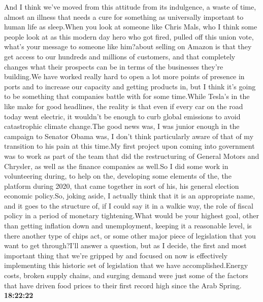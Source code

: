 \documentclass{article}%
\begin{document}
And I think we've moved from this attitude from its indulgence, a waste of time, almost an illness that needs a cure for something as universally important to human life as sleep.When you look at someone like Chris Mals, who I think some people look at as this modern day hero who got fired, pulled off this union vote, what's your message to someone like him?about selling on Amazon is that they get access to our hundreds and millions of customers, and that completely changes what their prospects can be in terms of the businesses they're building.We have worked really hard to open a lot more points of presence in ports and to increase our capacity and getting products in, but I think it's going to be something that companies battle with for some time.While Tesla's in the like make for good headlines, the reality is that even if every car on the road today went electric, it wouldn't be enough to curb global emissions to avoid catastrophic climate change.The good news was, I was junior enough in the campaign to Senator Obama was, I don't think particularly aware of that of my transition to his pain at this time.My first project upon coming into government was to work as part of the team that did the restructuring of General Motors and Chrysler, as well as the finance companies as well.So I did some work in volunteering during, to help on the, developing some elements of the, the platform during 2020, that came together in sort of his, his general election economic policy.So, joking aside, I actually think that it is an appropriate name, and it goes to the structure of, if I could say it in a walkie way, the role of fiscal policy in a period of monetary tightening.What would be your highest goal, other than getting inflation down and unemployment, keeping it a reasonable level, is there another type of chips act, or some other major piece of legislation that you want to get through?I'll answer a question, but as I decide, the first and most important thing that we're gripped by and focused on now is effectively implementing this historic set of legislation that we have accomplished.Energy costs, broken supply chains, and surging demand were just some of the factors that have driven food prices to their first record high since the Arab Spring.%
\textbf{18:22:22}%
\end{document}
